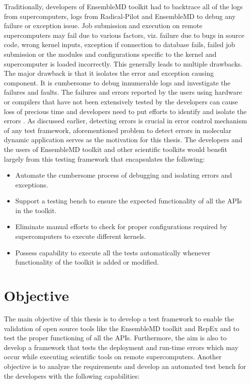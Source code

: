 \documentclass[10pt]{ruthesis}
\begin{document}
Traditionally, developers of EnsembleMD toolkit had to backtrace all of the logs from supercomputers, logs from Radical-Pilot and EnsembleMD to debug any failure or exception issue. Job submission and execution on remote supercomputers may fail due to various factors, viz. failure due to bugs in source code, wrong kernel inputs, exception if connection to database fails, failed job submission or the modules and configurations specific to the kernel and supercomputer is loaded incorrectly. This generally leads to multiple drawbacks. The major drawback is that it isolates the error and exception causing component. It is cumbersome to debug innumerable logs and investigate the failures and faults. The failures and errors reported by the users using hardware or compilers that have not been extensively tested by the developers can cause loss of precious time and developers need to put efforts to identify and isolate the errors \cite{ref16}. As discussed earlier, detecting errors is crucial in error control mechanism of any test framework, aforementioned problem to detect errors in molecular dynamic application serves as the motivation for this thesis. The developers and the users of EnsembleMD toolkit and other scientific toolkits would benefit largely from this testing framework that encapsulates the following:

\begin{itemize}
	\item Automate the cumbersome process of debugging and isolating errors and exceptions.
	\item Support a testing bench to ensure the expected functionality of all the APIs in the toolkit.
	\item Eliminate manual efforts to check for proper configurations required by supercomputers to execute different kernels.
	\item Possess capability to execute all the tests automatically whenever functionality of the toolkit is added or modified. 
\end{itemize} 

\section{Objective}
The main objective of this thesis is to develop a test framework to enable the validation of open source tools like the EnsembleMD toolkit and RepEx and to test the proper functioning of all the APIs. Furthermore, the aim is also to develop a framework that tests the deployment and run-time errors which may occur while executing scientific tools on remote supercomputers. Another objective is to analyze the requirements and develop an automated test bench for the developers with the following capabilities:
\end{document}
